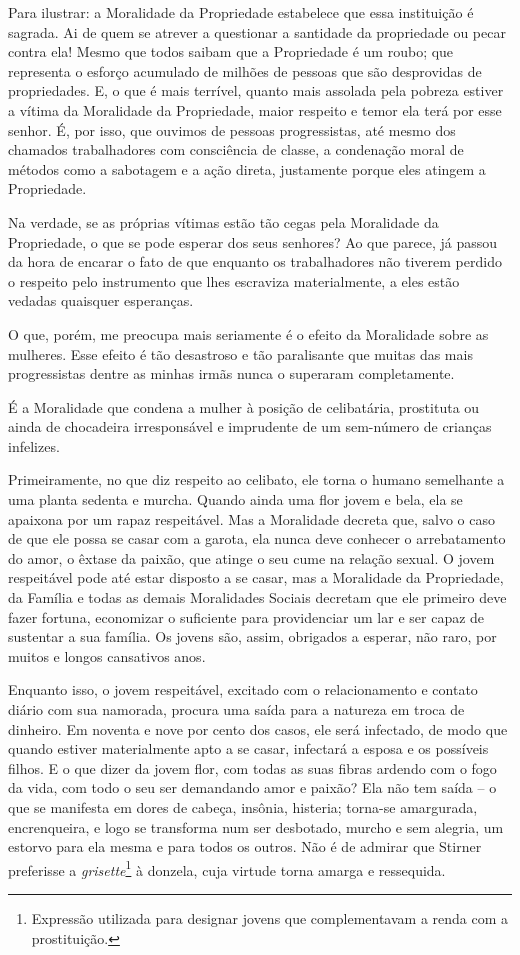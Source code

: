 Para ilustrar: a Moralidade da Propriedade estabelece que essa
instituição é sagrada. Ai de quem se atrever a questionar a santidade da
propriedade ou pecar contra ela! Mesmo que todos saibam que a
Propriedade é um roubo; que representa o esforço acumulado de milhões de
pessoas que são desprovidas de propriedades. E, o que é mais terrível,
quanto mais assolada pela pobreza estiver a vítima da Moralidade da
Propriedade, maior respeito e temor ela terá por esse senhor. É, por
isso, que ouvimos de pessoas progressistas, até mesmo dos chamados
trabalhadores com consciência de classe, a condenação moral de métodos
como a sabotagem e a ação direta, justamente porque eles atingem a
Propriedade.

Na verdade, se as próprias vítimas estão tão cegas pela Moralidade da
Propriedade, o que se pode esperar dos seus senhores? Ao que parece, já
passou da hora de encarar o fato de que enquanto os trabalhadores não
tiverem perdido o respeito pelo instrumento que lhes escraviza
materialmente, a eles estão vedadas quaisquer esperanças.

\asterisc

O que, porém, me preocupa mais seriamente é o efeito da Moralidade sobre
as mulheres. Esse efeito é tão desastroso e tão paralisante que muitas
das mais progressistas dentre as minhas irmãs nunca o superaram
completamente.

É a Moralidade que condena a mulher à posição de celibatária, prostituta
ou ainda de chocadeira irresponsável e imprudente de um sem-número de
crianças infelizes.

Primeiramente, no que diz respeito ao celibato, ele torna o humano
semelhante a uma planta sedenta e murcha. Quando ainda uma flor jovem e
bela, ela se apaixona por um rapaz respeitável. Mas a Moralidade decreta
que, salvo o caso de que ele possa se casar com a garota, ela nunca deve
conhecer o arrebatamento do amor, o êxtase da paixão, que atinge o seu
cume na relação sexual. O jovem respeitável pode até estar disposto a se
casar, mas a Moralidade da Propriedade, da Família e todas as demais
Moralidades Sociais decretam que ele primeiro deve fazer fortuna,
economizar o suficiente para providenciar um lar e ser capaz de
sustentar a sua família. Os jovens são, assim, obrigados a esperar, não
raro, por muitos e longos cansativos anos.

Enquanto isso, o jovem respeitável, excitado com o relacionamento e
contato diário com sua namorada, procura uma saída para a natureza em
troca de dinheiro. Em noventa e nove por cento dos casos, ele será
infectado, de modo que quando estiver materialmente apto a se casar,
infectará a esposa e os possíveis filhos. E o que dizer da jovem flor,
com todas as suas fibras ardendo com o fogo da vida, com todo o seu ser
demandando amor e paixão? Ela não tem saída -- o que se manifesta em
dores de cabeça, insônia, histeria; torna-se amargurada, encrenqueira, e
logo se transforma num ser desbotado, murcho e sem alegria, um estorvo
para ela mesma e para todos os outros. Não é de admirar que Stirner
preferisse a \emph{grisette}\footnote{Expressão utilizada para designar
  jovens que complementavam a renda com a prostituição.} à donzela, cuja
virtude torna amarga e ressequida.

